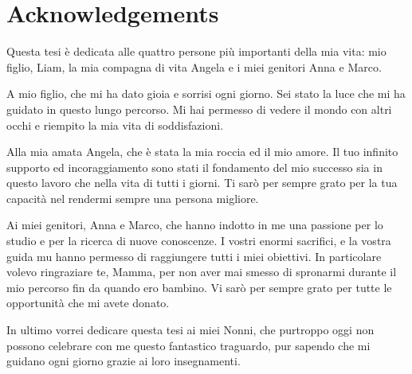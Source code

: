 \documentclass{Configuration_Files/PoliMi3i_thesis}
\begin{document}
\listoffigures

\listoftables

\lstlistoflistings

\chapter*{Acknowledgements}
Questa tesi è dedicata alle quattro persone più importanti della mia vita: mio figlio, Liam, la mia compagna di vita Angela e i miei genitori Anna e Marco.

A mio figlio, che mi ha dato gioia e sorrisi ogni giorno. 
Sei stato la luce che mi ha guidato in questo lungo percorso. 
Mi hai permesso di vedere il mondo con altri occhi e riempito la mia vita di soddisfazioni.

Alla mia amata Angela, che è stata la mia roccia ed il mio amore.
Il tuo infinito supporto ed incoraggiamento sono stati il fondamento del mio successo sia in questo lavoro che nella vita di tutti i giorni.
Ti sarò per sempre grato per la tua capacità nel rendermi sempre una persona migliore.

Ai miei genitori, Anna e Marco, che hanno indotto in me una passione per lo studio e per la ricerca di nuove conoscenze.
I vostri enormi sacrifici, e la vostra guida mu hanno permesso di raggiungere tutti i miei obiettivi.
In particolare volevo ringraziare te, Mamma, per non aver mai smesso di spronarmi durante il mio percorso fin da quando ero bambino. 
Vi sarò per sempre grato per tutte le opportunità che mi avete donato.

In ultimo vorrei dedicare questa tesi ai miei Nonni, che purtroppo oggi non possono celebrare con me questo fantastico traguardo, pur sapendo che mi guidano ogni giorno grazie ai loro insegnamenti.

\cleardoublepage
\end{document}
